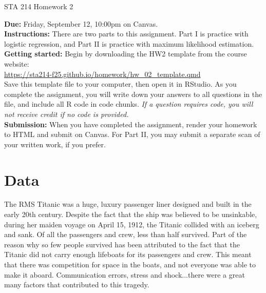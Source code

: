 \documentclass[11pt]{article}
\begin{document}
\begin{center}
\Large
STA 214 Homework 2\\
\normalsize
\vspace{5mm}
\end{center}

\noindent \textbf{Due:} Friday, September 12, 10:00pm on Canvas.\\ 

\noindent \textbf{Instructions:} There are two parts to this assignment. Part I is practice with logistic regression,  and Part II is practice with maximum likelihood estimation.\\

\noindent \textbf{Getting started:} Begin by downloading the HW2 template from the course website:\\

\url{https://sta214-f25.github.io/homework/hw_02_template.qmd}\\

\noindent Save this template file to your computer, then open it in RStudio. As you complete the assignment, you will write down your answers to all questions in the file, and include all R code in code chunks. \textit{If a question requires code, you will not receive credit if no code is provided.}\\

\noindent \textbf{Submission:} When you have completed the assignment, render your homework to HTML and submit on Canvas. For Part II, you may submit a separate scan of your written work, if you prefer.

\section*{Data}

The RMS Titanic was a huge, luxury passenger liner designed and built in the early 20th century. Despite the fact that the ship was believed to be unsinkable, during her maiden voyage on April 15, 1912, the Titanic collided with an iceberg and sank. Of all the passengers and crew, less than half survived. Part of the reason why so few people survived has been attributed to the fact that the Titanic did not carry enough lifeboats for its passengers and crew. This meant that there was competition for space in the boats, and not everyone was able to make it aboard. Communication errors, stress and shock...there were a great many factors that contributed to this tragedy.\\
\end{document}
